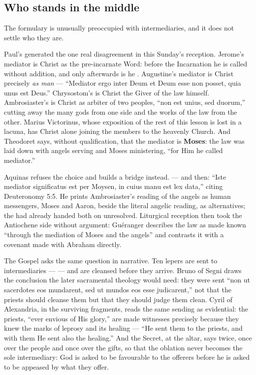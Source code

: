 \subsection*{Who stands in the middle}

The formulary is unusually preoccupied with intermediaries, and it does not
settle who they are.

Paul's  generated the one real
disagreement in this Sunday's reception. Jerome's mediator is Christ as the
pre-incarnate Word: before the Incarnation he is called 
without addition, and only afterwards is he . Augustine's mediator is Christ precisely \textit{as man}
--- ``Mediator ergo inter Deum et Deum esse non posset, quia unus est Deus.''
Chrysostom's is Christ the Giver of the law himself. Ambrosiaster's is Christ
as arbiter of two peoples, ``non est unius, sed duorum,'' cutting away the many
gods from one side and the works of the law from the other. Marius Victorinus,
whose exposition of the rest of this lesson is lost in a lacuna, has Christ
alone joining the members to the heavenly Church. And Theodoret says, without
qualification, that the mediator is \textbf{Moses}: the law was laid down with
angels serving and Moses ministering, ``for Him he called mediator.''

Aquinas refuses the choice and builds a bridge instead.  --- and then: ``Iste mediator
significatus est per Moysen, in cuius manu est lex data,'' citing Deuteronomy
5:5. He prints Ambrosiaster's reading of the angels as human messengers,
Moses and Aaron, beside the literal angelic reading, as alternatives; the
 had already handed both on unresolved. Liturgical
reception then took the Antiochene side without argument: Guéranger describes
the law as made known ``through the mediation of Moses and the angels'' and
contrasts it with a covenant made with Abraham directly.

The Gospel asks the same question in narrative. Ten lepers are sent to
intermediaries ---  --- and are cleansed
before they arrive. Bruno of Segni draws the conclusion the later sacramental
theology would need: they were sent ``non ut sacerdotes eos mundarent, sed ut
mundos eos esse judicarent,'' not that the priests should cleanse them but that
they should judge them clean. Cyril of Alexandria, in the surviving fragments,
reads the same sending as evidential: the priests, ``ever envious of His
glory,'' are made witnesses precisely because they knew the marks of leprosy
and its healing --- ``He sent them to the priests, and with them He sent also
the healing.'' And the Secret, at the altar, says  twice, once
over the people and once over the gifts, so that the oblation never becomes the
sole intermediary: God is asked to be favourable to the offerers before he is
asked to be appeased by what they offer.

